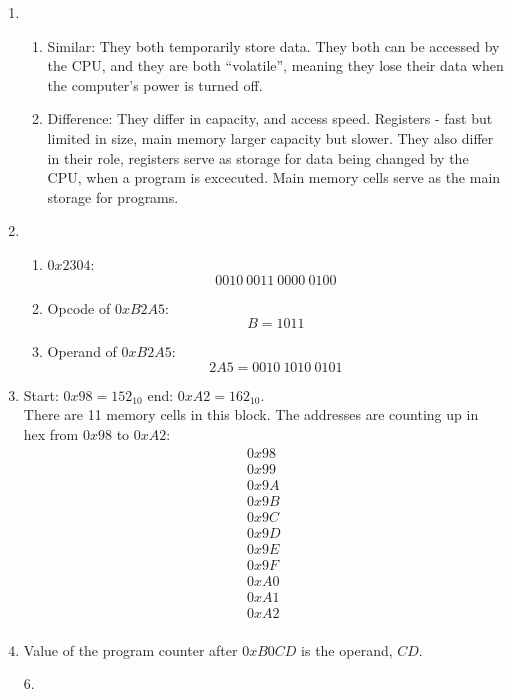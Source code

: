 \documentclass[hidelinks,12pt]{article}
\title{\scalebox{1.5}{CompSci 150 Homework 2}}
\author{\scalebox{1.5}{Theo Koss}}
\date{April 2024}
\begin{document}
\maketitle
\begin{enumerate}
    \item \begin{enumerate}
            \item Similar: They both temporarily store data. They both can be accessed by the CPU, and they are both ``volatile'', meaning they lose their data when the computer's power is turned off.
            \item Difference: They differ in capacity, and access speed. Registers - fast but limited in size, main memory larger capacity but slower. They also differ in their role, registers serve as storage for data being changed by the CPU, when a program is excecuted. Main memory cells serve as the main storage for programs.
        \end{enumerate}
    \item \begin{enumerate}
            \item $0x2304$:\[0010\ 0011\ 0000\ 0100\]
            \item Opcode of $0xB2A5$:\[B=1011\]
            \item Operand of $0xB2A5$:\[2A5=0010\ 1010\ 0101\]
        \end{enumerate}
    \item Start: $0x98=152_{10}$ end: $0xA2=162_{10}$.\\ There are 11 memory cells in this block. The addresses are counting up in hex from $0x98$ to $0xA2$:\begin{align*}
        0x98\\
        0x99\\
        0x9A\\
        0x9B\\
        0x9C\\
        0x9D\\
        0x9E\\
        0x9F\\
        0xA0\\
        0xA1\\
        0xA2\\
    \end{align*}
\item Value of the program counter after $0xB0CD$ is the operand, $CD$.
    \item[6.] \begin{enumerate}

\end{enumerate}
\end{enumerate}
\end{document}
